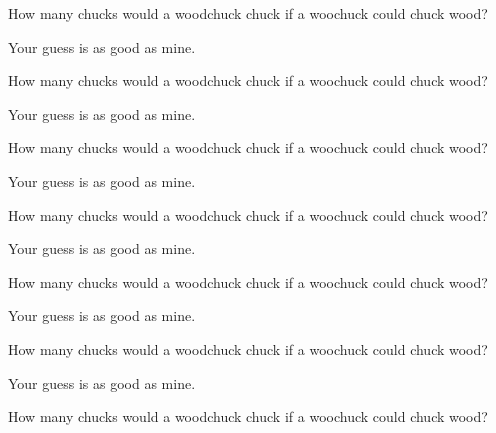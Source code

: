 \documentclass[12pt]{article}
\newenvironment{question}[2][Q]{\begin{trivlist}
\item[\hskip \labelsep {\bfseries #1}\hskip \labelsep {\bfseries #2.}]}{\end{trivlist}}
\newenvironment{answer}[2][A]{\begin{trivlist}
\item[\hskip \labelsep {\bfseries #1}\hskip \labelsep {\bfseries #2.}]}{\end{trivlist}}
\begin{document}
\begin{question}{2}
  How many chucks would a woodchuck chuck if a woochuck could chuck wood?
\end{question}

\begin{answer}{2}
Your guess is as good as mine.
\end{answer}

\begin{question}{3}
  How many chucks would a woodchuck chuck if a woochuck could chuck wood?
\end{question}

\begin{answer}{3}
Your guess is as good as mine.
\end{answer}

\begin{question}{4}
  How many chucks would a woodchuck chuck if a woochuck could chuck wood?
\end{question}

\begin{answer}{4}
Your guess is as good as mine.
\end{answer}

\begin{question}{5}
  How many chucks would a woodchuck chuck if a woochuck could chuck wood?
\end{question}

\begin{answer}{5}
Your guess is as good as mine.
\end{answer}


\begin{question}{6}
  How many chucks would a woodchuck chuck if a woochuck could chuck wood?
\end{question}

\begin{answer}{6}
Your guess is as good as mine.
\end{answer}

\begin{question}{7}
  How many chucks would a woodchuck chuck if a woochuck could chuck wood?
\end{question}

\begin{answer}{7}
Your guess is as good as mine.
\end{answer}

\begin{question}{8}
  How many chucks would a woodchuck chuck if a woochuck could chuck wood?
\end{question}
\end{document}
